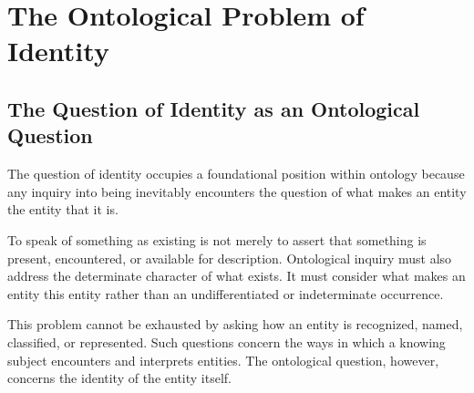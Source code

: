 
%
%
%
%
%
%
%
%
%
%
%
%


\section{The Ontological Problem of Identity}
\label{sec:ontological-problem-of-identity}



\subsection{The Question of Identity as an Ontological Question}
\label{subsec:identity-as-ontological-question}

The question of identity occupies a foundational position
within ontology because any inquiry into being inevitably
encounters the question of what makes an entity the entity
that it is.

To speak of something as existing is not merely to assert
that something is present, encountered, or available for
description. Ontological inquiry must also address the
determinate character of what exists. It must consider
what makes an entity this entity rather than an
undifferentiated or indeterminate occurrence.

This problem cannot be exhausted by asking how an entity
is recognized, named, classified, or represented. Such
questions concern the ways in which a knowing subject
encounters and interprets entities. The ontological
question, however, concerns the identity of the entity
itself.


